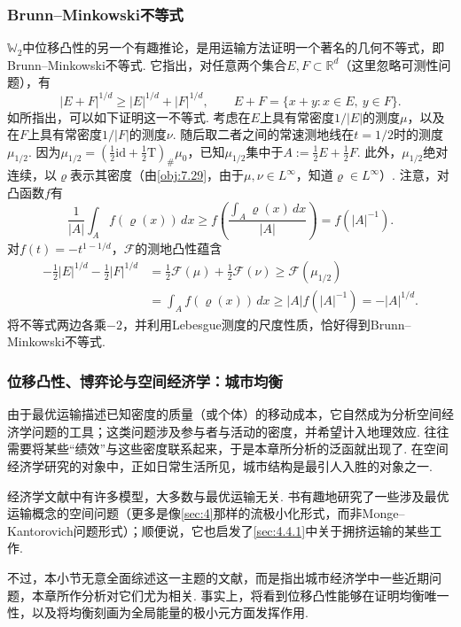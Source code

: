 \subsubsection{Brunn--Minkowski不等式}\label{sec:7.4.2}
$\mathbb W_2$中位移凸性的另一个有趣推论，是用运输方法证明一个著名的几何不等式，即Brunn--Minkowski不等式. 它指出，对任意两个集合$E,F\subset\mathbb R^d$（这里忽略可测性问题），有
\[
 |E+F|^{1/d}\geq|E|^{1/d}+|F|^{1/d},\qquad
 E+F=\{x+y:x\in E,\ y\in F\}.
\]
如\cite{b229}所指出，可以如下证明这一不等式. 考虑在$E$上具有常密度$1/|E|$的测度$\mu$，以及在$F$上具有常密度$1/|F|$的测度$\nu$. 随后取二者之间的常速测地线在$t=1/2$时的测度$\mu_{1/2}$. 因为$\mu_{1/2}=(\frac12\mathrm{id}+\frac12\mathrm T)_\#\mu_0$，已知$\mu_{1/2}$集中于$A:=\frac12E+\frac12F$. 此外，$\mu_{1/2}$绝对连续，以$\varrho$表示其密度（由\autoref{obj:7.29}，由于$\mu,\nu\in L^\infty$，知道$\varrho\in L^\infty$）. 注意，对凸函数$f$有
\[
 \frac1{|A|}\int_A f(\varrho(x))\,dx
 \geq f\left(\frac{\int_A\varrho(x)\,dx}{|A|}\right)=f(|A|^{-1}).
\]
对$f(t)=-t^{1-1/d}$，$\mathscr F$的测地凸性蕴含
\[
\begin{aligned}
 -\frac12|E|^{1/d}-\frac12|F|^{1/d}
 &=\frac12\mathscr F(\mu)+\frac12\mathscr F(\nu)\geq\mathscr F(\mu_{1/2})\\
 &=\int_A f(\varrho(x))\,dx\geq|A|f(|A|^{-1})=-|A|^{1/d}.
\end{aligned}
\]
将不等式两边各乘$-2$，并利用Lebesgue测度的尺度性质，恰好得到Brunn--Minkowski不等式.

\subsubsection{位移凸性、博弈论与空间经济学：城市均衡}\label{sec:7.4.3}
由于最优运输描述已知密度的质量（或个体）的移动成本，它自然成为分析空间经济学问题的工具；这类问题涉及参与者与活动的密度，并希望计入地理效应. 往往需要将某些“绩效”与这些密度联系起来，于是本章所分析的泛函就出现了. 在空间经济学研究的对象中，正如日常生活所见，城市结构是最引人入胜的对象之一.

经济学文献中有许多模型，大多数与最优运输无关. 书\cite{b28}有趣地研究了一些涉及最优运输概念的空间问题（更多是像\autoref{sec:4}那样的流极小化形式，而非Monge--Kantorovich问题形式）；顺便说，它也启发了\autoref{sec:4.4.1}中关于拥挤运输的某些工作.

不过，本小节无意全面综述这一主题的文献，而是指出城市经济学中一些近期问题，本章所作分析对它们尤为相关. 事实上，将看到位移凸性能够在证明均衡唯一性，以及将均衡刻画为全局能量的极小元方面发挥作用.

